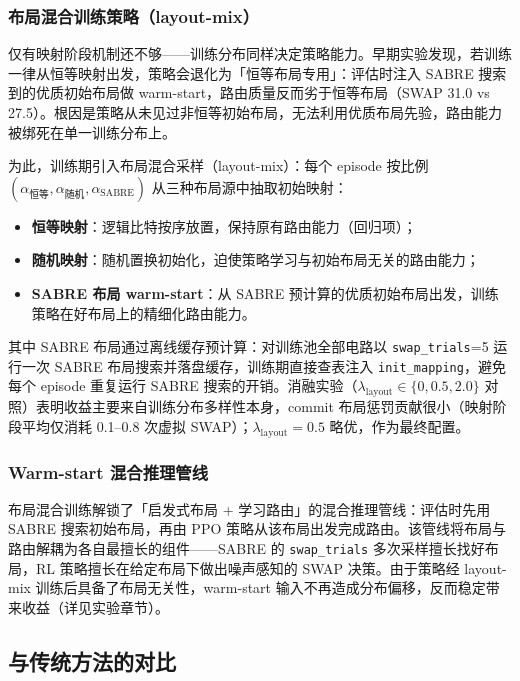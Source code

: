 \subsubsection{布局混合训练策略（layout-mix）}

仅有映射阶段机制还不够——训练分布同样决定策略能力。早期实验发现，若训练一律从恒等映射出发，策略会退化为「恒等布局专用」：评估时注入 SABRE 搜索到的优质初始布局做 warm-start，路由质量反而劣于恒等布局（SWAP 31.0 vs 27.5）。根因是策略从未见过非恒等初始布局，无法利用优质布局先验，路由能力被绑死在单一训练分布上。

为此，训练期引入布局混合采样（layout-mix）：每个 episode 按比例 $(\alpha_{\text{恒等}}, \alpha_{\text{随机}}, \alpha_{\text{SABRE}})$ 从三种布局源中抽取初始映射：
\begin{itemize}
  \item \textbf{恒等映射}：逻辑比特按序放置，保持原有路由能力（回归项）；
  \item \textbf{随机映射}：随机置换初始化，迫使策略学习与初始布局无关的路由能力；
  \item \textbf{SABRE 布局 warm-start}：从 SABRE 预计算的优质初始布局出发，训练策略在好布局上的精细化路由能力。
\end{itemize}

其中 SABRE 布局通过离线缓存预计算：对训练池全部电路以 \texttt{swap\_trials}=5 运行一次 SABRE 布局搜索并落盘缓存，训练期直接查表注入 \texttt{init\_mapping}，避免每个 episode 重复运行 SABRE 搜索的开销。消融实验（$\lambda_{\text{layout}} \in \{0, 0.5, 2.0\}$ 对照）表明收益主要来自训练分布多样性本身，commit 布局惩罚贡献很小（映射阶段平均仅消耗 0.1--0.8 次虚拟 SWAP）；$\lambda_{\text{layout}} = 0.5$ 略优，作为最终配置。

\subsubsection{Warm-start 混合推理管线}

布局混合训练解锁了「启发式布局 + 学习路由」的混合推理管线：评估时先用 SABRE 搜索初始布局，再由 PPO 策略从该布局出发完成路由。该管线将布局与路由解耦为各自最擅长的组件——SABRE 的 \texttt{swap\_trials} 多次采样擅长找好布局，RL 策略擅长在给定布局下做出噪声感知的 SWAP 决策。由于策略经 layout-mix 训练后具备了布局无关性，warm-start 输入不再造成分布偏移，反而稳定带来收益（详见实验章节）。

\subsection{与传统方法的对比}

